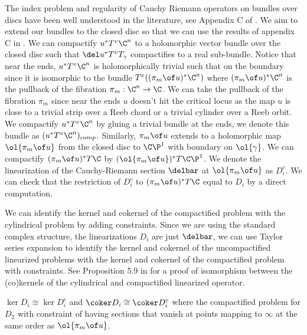 The index problem and regularity of Cauchy Riemann operators on bundles over discs have been well understood in the literature, see Appendix C of \cite{jholobook}.  We aim to extend our bundles to the closed disc so that we can use the results of appendix C in \cite{jholobook}. We can compactify $u^*T^v\C^n$ to a holomorphic vector bundle over the closed disc such that $\del u^* T^v T_\gamma$ compactifies to a real sub-bundle. Notice that near the ends, $u^*T^v\C^n$ is holomorphically trivial such that on the boundary since it is isomorphic to the bundle $T^v ((\pi_m \of u)^*\C^n)$ where $(\pi_m \of u)^*\C^n$ is the pullback of the fibration $\pi_m : \C^n \to \C$. We can take the pullback of the fibration $\pi_m$ since near the ends $u$ doesn't hit the critical locus as the map $u$ is close to a trivial strip over a Reeb chord or a trivial cylinder over a Reeb orbit. We compactify $u^*T^v\C^n$ by gluing a trivial bundle at the ends, we denote this bundle as $(u^*T^v\C^n)_{comp}$. Similarly, $\pi_m \of u$ extends to a holomorphic map $\ol{\pi_m \of u}$ from the closed disc to $\C\P^1$ with boundary on $\ol{\gamma}$. We can compactify $(\pi_m\of u )^* T\C$ by $(\ol{\pi_m \of u})^*T\C\P^1$. We denote the linearization of the Cauchy-Riemann section $\delbar$ at $\ol{\pi_m \of u}$ as  $D^c_i$. We can check that the restriction of $D^c_i$  to $(\pi_m \of u)^*T\C$ equal to $D_i$ by a direct computation.

We can identify the kernel and cokernel of the compactified problem with the cylindrical problem by adding constraints. Since we are using the standard complex structure, the linearizations $D_i$ are just $\delbar$, we can use Taylor series expansion to identify the kernel and cokernel of the uncompactified linearized problems with the kernel and cokernel of the compactified problem with constraints. See Proposition 5.9 in \cite{palmerwoodwardsurg} for a proof of isomorphism between the (co)kernels of the cylindrical and compactified linearized operator. 
\begin{lemma}\label{lemm:identif}
$\ker D_i \cong \ker D^c_i$ and $\coker D_i \cong \coker D^c_i$ where the compactified problem for $D_2$ with constraint of having sections that vanish at points mapping to $\infty$ at the same order as $ \ol {\pi_m\of u}$.
\end{lemma}

